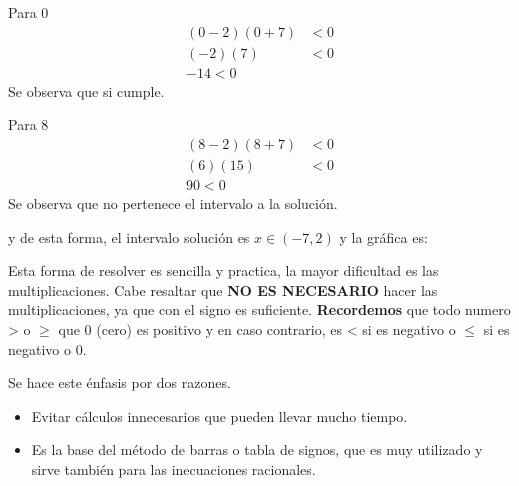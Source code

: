 \documentclass[12pt]{article}
\begin{document}
    Para 0
    \begin{align*}
        (0-2)(0+7) & < 0  		\\
        (-2)(7)   & < 0\\
        -14 < 0
    \end{align*}
    Se observa que si cumple.

    Para 8
    \begin{align*}
        (8-2)(8+7) & < 0  		\\
        (6)(15)   & < 0\\
        90 < 0
    \end{align*}
    Se observa que no pertenece el intervalo a la solución.

    y de esta forma, el intervalo solución es $x\in(-7,2)$ y la gráfica es:

    \vspace*{1cm}

    Esta forma de resolver es sencilla y practica, la mayor dificultad es las
    multiplicaciones. Cabe resaltar que \textbf{NO ES NECESARIO} hacer las
    multiplicaciones, ya que con el signo es suficiente. \textbf{Recordemos} que
    todo numero > o $\geq$ que 0 (cero) es positivo y en caso contrario, es
    < si es negativo o $ \leq $  si es negativo o 0.

    Se hace este énfasis por dos razones.

    \begin{itemize}
        \item Evitar cálculos innecesarios que pueden llevar mucho tiempo.
        \item Es la base del método de barras o tabla de signos, que es muy
            utilizado y sirve también para las inecuaciones racionales.
    \end{itemize}
\end{document}
